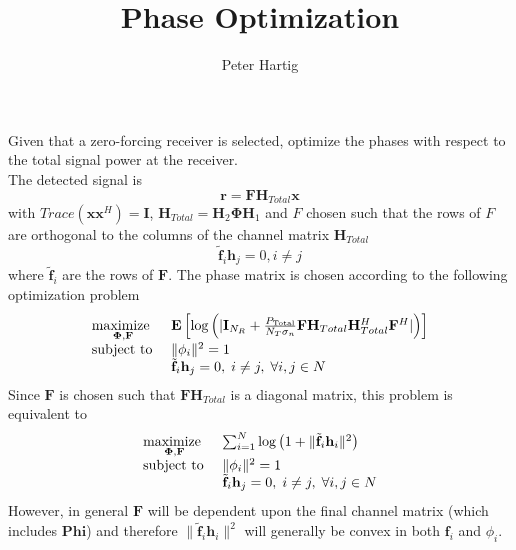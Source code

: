 \documentclass[12pt,a4paper]{article}
\title{Phase Optimization}
\author{Peter Hartig}
\begin{document}
\maketitle
Given that a zero-forcing receiver is selected, optimize the phases with respect to the total signal power at the receiver. 
\\
	The detected signal is
	 \begin{equation}
		\mathbf{r} = \mathbf{F}\mathbf{H}_{Total}\mathbf{x}
	\end{equation}
	with $Trace(\mathbf{x} \mathbf{x}^H) = \mathbf{I}$, $ \mathbf{H}_{Total} = \mathbf{H}_{2}\boldsymbol{\Phi}
	\mathbf{H}_{1} $
	and $F$ chosen such that the rows of $F$ are orthogonal to the 
	columns of the channel matrix $ \mathbf{H}_{Total}$
	\begin{equation}
		\tilde{\mathbf{f}}_i \mathbf{h}_j = 0 , i\neq j 
	\end{equation}
	 where $\tilde{\mathbf{f}}_i$ are the rows of $\mathbf{F}$.
	The phase matrix is chosen according to the following optimization problem
	    \begin{equation}
    \begin{array}{ll}
    \underset{\boldsymbol{\Phi}, \mathbf{F}}{\text{maximize }}   & \mathop{\bf E{}}\left[\text{log{}}\left(|\mathbf{I}_{N_R}+\frac{P_{\text{Total}}}{N_T \sigma_n}\mathbf{F}\mathbf{H}_{Total}\mathbf{H}_{Total}^H\mathbf{F}^H|\right)\right]
    \\
    \mbox{subject to } & \|\phi_i\|^2 = 1
        \\
    \mbox{} & \tilde{\mathbf{f}}_i \mathbf{h}_j = 0, \; i\neq j, \; \forall i,j \in N
    \end{array}
    \label{general_irs_opt}
    \end{equation} 
    Since $\mathbf{F}$ is chosen such that $\mathbf{F}\mathbf{H}_{Total}$ is a diagonal matrix, this problem is 	
    equivalent to 
    	    \begin{equation}
    \begin{array}{ll}
    \underset{\boldsymbol{\Phi}, \mathbf{F}}{\text{maximize }}  
     & \sum_{i=1}^{N}\text{log{}}\left(1+ \|\tilde{\mathbf{f}}_i \mathbf{h}_i\|^2
    \right)
    \\
    \mbox{subject to } & \|\phi_i\|^2 = 1
    \\
        \mbox{} & \tilde{\mathbf{f}}_i \mathbf{h}_j = 0, \; i\neq j, \; \forall i,j \in N
    \end{array}
    \label{general_irs_opt}
    \end{equation} 
    However, in general $\mathbf{F}$ will be dependent upon the final channel matrix (which includes
     $\boldsymbol{Phi}$) and
    therefore $\|\tilde{\mathbf{f}}_i \mathbf{h}_i\|^2$ will generally be convex in both $\mathbf{f}_i$ and 
    $\phi_i$.
    
    
\end{document}
